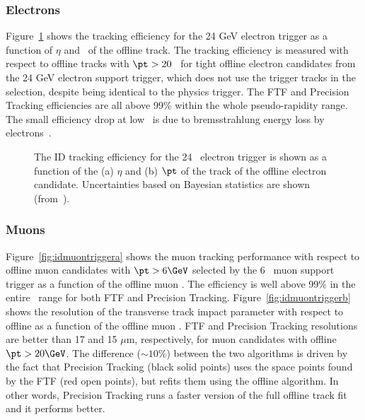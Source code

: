 			\subsubsection*{Electrons}

				Figure~\ref{fig:ele_idtrig_eff} shows the tracking efficiency for the 24 GeV electron trigger as a function of $\eta$ and \pt\ of the offline track. The tracking efficiency is measured with respect to offline tracks with $\pt > 20$ \GeV\ for tight offline electron candidates from the 24 GeV electron support trigger, which does not use the trigger tracks in the selection, despite being identical to the physics trigger. The \ac{FTF} and Precision Tracking efficiencies are all above 99\% within the whole pseudo-rapidity range. The small efficiency drop at low \pt\ is due to bremsstrahlung energy loss by electrons~\cite{ATLASTrigger2015}.

				\begin{figure}[!htb]
					\begin{center}
						\hspace{0.05\textwidth}
						\hspace{0.05\textwidth}
					\end{center}
					\caption{The ID tracking efficiency for the 24 \GeV\ electron trigger is shown as a function of the (a) $\eta$ and (b) $\pt$ of the track of the offline electron candidate. Uncertainties based on Bayesian statistics are shown (from~\cite{ATLASTrigger2015}).}
					\label{fig:ele_idtrig_eff}
				\end{figure}


			\subsubsection*{Muons}

				Figure~\ref{fig:idmuontriggera} shows the muon tracking performance with respect to offline muon candidates with $\pt > 6 \GeV$ selected by the 6 \GeV\ muon support trigger as a function of the offline muon \pt. The efficiency is well above 99\% in the entire \pt\ range for both \ac{FTF} and Precision Tracking. Figure~\ref{fig:idmuontriggerb} shows the resolution of the transverse track impact parameter with respect to offline as a function of the offline muon \pt. \ac{FTF} and Precision Tracking resolutions are better than 17 and 15 $\mu$m, respectively, for muon candidates with offline $\pt > 20 \GeV$. The difference ($\sim 10\%$) between the two algorithms is driven by the fact that Precision Tracking (black solid points) uses the space points found by the \ac{FTF} (red open points), but refits them using the offline algorithm. In other words, Precision Tracking runs a faster version of the full offline track fit and it performs better.

